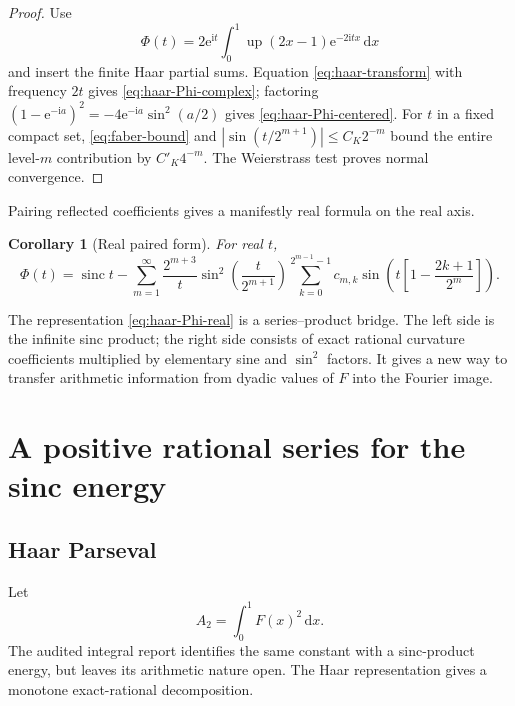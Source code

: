 \documentclass[11pt,oneside]{article}
\newtheorem{corollary}[theorem]{Corollary}
\theoremstyle{definition}
\theoremstyle{remark}
\newcommand{\Up}{\operatorname{up}}
\newcommand{\sinc}{\operatorname{sinc}}
\newcommand{\dd}{\,\mathrm d}
\newcommand{\ii}{\mathrm i}
\newcommand{\e}{\mathrm e}
\newcommand{\1}{\mathbf 1}
\begin{document}
\begin{proof}
Use
\[
 \Phi(t)=2\e^{\ii t}\int_0^1\Up(2x-1)\e^{-2\ii tx}\dd x
\]
and insert the finite Haar partial sums.  Equation
\eqref{eq:haar-transform} with frequency $2t$ gives
\eqref{eq:haar-Phi-complex}; factoring
$(1-\e^{-\ii a})^2=-4\e^{-\ii a}\sin^2(a/2)$ gives
\eqref{eq:haar-Phi-centered}.  For $t$ in a fixed compact set,
\eqref{eq:faber-bound} and
$|\sin(t/2^{m+1})|\le C_K2^{-m}$ bound the entire level-$m$ contribution by
$C'_K4^{-m}$.  The Weierstrass test proves normal convergence.
\end{proof}

Pairing reflected coefficients gives a manifestly real formula on the real
axis.

\begin{corollary}[Real paired form]
\label{cor:haar-Phi-real}
For real $t$,
\begin{equation}
 \boxed{\displaystyle
 \Phi(t)=\sinc t-
 \sum_{m=1}^\infty\frac{2^{m+3}}{t}
 \sin^2\!\left(\frac{t}{2^{m+1}}\right)
 \sum_{k=0}^{2^{m-1}-1}c_{m,k}
 \sin\!\left(t\left[1-\frac{2k+1}{2^m}\right]\right).} \label{eq:haar-Phi-real}
\end{equation}
\end{corollary}

The representation \eqref{eq:haar-Phi-real} is a series--product bridge.  The
left side is the infinite sinc product; the right side consists of exact
rational curvature coefficients multiplied by elementary sine and
$\sin^2$ factors.  It gives a new way to transfer arithmetic information from
dyadic values of $F$ into the Fourier image.

\section{A positive rational series for the sinc energy}
\label{sec:energy}

\subsection{Haar Parseval}

Let
\begin{equation}
 A_2=\int_0^1F(x)^2\dd x.                                \label{eq:A2-definition}
\end{equation}
The audited integral report identifies the same constant with a sinc-product
energy, but leaves its arithmetic nature open.  The Haar representation gives
a monotone exact-rational decomposition.
\end{document}
